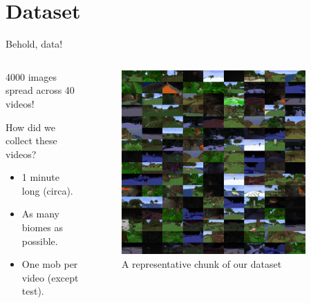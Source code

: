 \documentclass[english]{beamer}
\begin{document}
\section{Dataset}
\begin{frame}{Behold, data!}
  \begin{columns}
    \begin{column}{0.5\textwidth}
      4000 images spread across 40 videos!

      How did we collect these videos?
      \begin{itemize}
        \item 1 minute long (circa).
        \item As many biomes as possible.
        \item One mob per video (except test).
      \end{itemize}
    \end{column}

    \begin{column}{0.5\textwidth}
      \begin{figure}[h]
          \centering
          \includegraphics[width=0.9\textwidth]{../images/dtset_repr.png}
          \caption{A representative chunk of our dataset}
      \end{figure}
    \end{column}

  \end{columns}
\end{frame}
\end{document}
